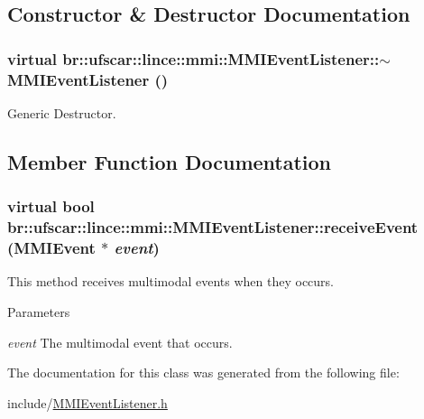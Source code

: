 \subsection{Constructor \& Destructor Documentation}
\hypertarget{classbr_1_1ufscar_1_1lince_1_1mmi_1_1MMIEventListener_a49dad88c24782f8d123289aea725e73e}{
\subsubsection[{$\sim$MMIEventListener}]{\setlength{\rightskip}{0pt plus 5cm}virtual br::ufscar::lince::mmi::MMIEventListener::$\sim$MMIEventListener ()}}
\label{classbr_1_1ufscar_1_1lince_1_1mmi_1_1MMIEventListener_a49dad88c24782f8d123289aea725e73e}


Generic Destructor. 



\subsection{Member Function Documentation}
\hypertarget{classbr_1_1ufscar_1_1lince_1_1mmi_1_1MMIEventListener_a2b7631e7ed09e2235b021fb2b5ba3b66}{
\subsubsection[{receiveEvent}]{\setlength{\rightskip}{0pt plus 5cm}virtual bool br::ufscar::lince::mmi::MMIEventListener::receiveEvent ({\bf MMIEvent} $\ast$ {\em event})}}
\label{classbr_1_1ufscar_1_1lince_1_1mmi_1_1MMIEventListener_a2b7631e7ed09e2235b021fb2b5ba3b66}


This method receives multimodal events when they occurs. 


\begin{DoxyParams}{Parameters}
\item[{\em event}]The multimodal event that occurs. \end{DoxyParams}


The documentation for this class was generated from the following file:\begin{DoxyCompactItemize}
\item 
include/\hyperlink{MMIEventListener_8h}{MMIEventListener.h}\end{DoxyCompactItemize}
